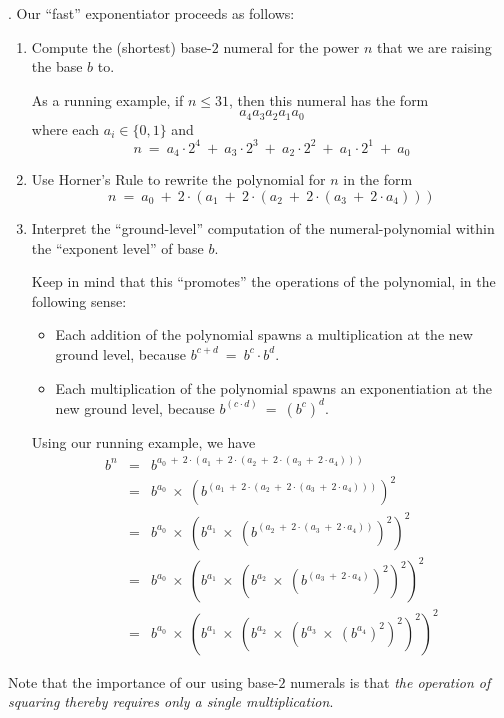 .
Our ``fast'' exponentiator proceeds as follows:
\begin{enumerate}
\item
Compute the (shortest) base-$2$ numeral for the power $n$ that we are raising the base $b$ to.

\smallskip

As a running example, if $n \leq 31$, then this numeral has the form
\[ a_4 a_3 a_2 a_1 a_0 \]
where each $a_i \in \{0,1\}$ and
\[ n \ = \ a_4 \cdot 2^4 \ + \  a_3 \cdot 2^3 \ + \  a_2 \cdot 2^2 \ + \  a_1 \cdot 2^1 \ + \ a_0 \] 

\medskip\item
Use Horner's Rule to rewrite the polynomial for $n$ in the form
\[ n \ = \ a_0 \ + \ 2 \cdot (a_1 \ + \ 2 \cdot (a_2 \ + \ 2 \cdot (a_3 \ + \ 2 \cdot a_4 ))) \]

\medskip\item
Interpret the ``ground-level'' computation of the numeral-polynomial within the ``exponent level'' of base $b$.

\smallskip

Keep in mind that this ``promotes'' the operations of the polynomial, in the following sense:
\begin{itemize}
\item
Each addition of the polynomial spawns a multiplication at the new ground level, because $b^{c + d} \ = \ b^c \cdot b^d$.
\medskip\item
Each multiplication of the polynomial spawns an exponentiation at the new ground level, because $b^{(c \cdot d)} \ = \ (b^c)^d$.
\end{itemize}

\smallskip

Using our running example, we have
\begin{eqnarray*}
b^n & = &
 b^{a_0 \ + \ 2 \cdot (a_1 \ + \ 2 \cdot (a_2 \ + \ 2 \cdot (a_3 \ + \
          2 \cdot a_4 )))} \\
    & = &
 b^{a_0} \ \times \ 
\left( b^{
(a_1 \ + \ 2 \cdot (a_2 \ + \ 2 \cdot (a_3 \ + \ 2 \cdot a_4 )))}
\right)^2 \\
    & = &
 b^{a_0} \ \times \
\left(
b^{a_1}  \ \times \
\left(
b^{(a_2 \ + \ 2 \cdot (a_3 \ + \ 2 \cdot a_4 ))}
\right)^2
\right)^2 \\
    & = &
b^{a_0} \ \times \
\left(
b^{a_1}  \ \times \
\left(
b^{a_2}  \ \times \
\left(
b^{(a_3 \ + \ 2 \cdot a_4 )}
\right)^2
\right)^2
\right)^2 \\
    & = &
b^{a_0} \ \times \
\left(
b^{a_1}  \ \times \
\left(
b^{a_2}  \ \times \
\left(
b^{a_3}  \ \times \
\left(
b^{a_4}
\right)^2
\right)^2
\right)^2
\right)^2
\end{eqnarray*}
\end{enumerate}
Note that the importance of our using base-$2$ numerals is that {\em the operation of squaring thereby requires only a single multiplication}.


